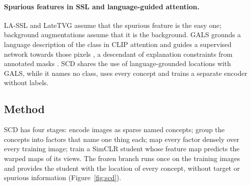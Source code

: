 \documentclass[11pt]{article}
\begin{document}
\paragraph{Spurious features in SSL and language-guided attention.} LA-SSL \citep{zhu2023lassl} and LateTVG
\citep{hamidieh2024latetvg} assume that the spurious feature is the easy one; background augmentations
\citep{ryali2021background} assume that it is the background. GALS grounds a language description of the class in
CLIP attention and guides a supervised network towards those pixels \citep{petryk2022gals}, a descendant of
explanation constraints from annotated masks \citep{ross2017rrr}. SCD shares the use of language-grounded locations
with GALS, while it names no class, uses every concept and trains a separate encoder without labels.

\subsection{Method}
SCD has four stages: encode images as sparse named concepts; group the concepts into factors that name one thing
each; map every factor densely over every training image; train a SimCLR student whose feature map predicts the
warped maps of its views. The frozen branch runs once on the training images and provides the student with the
location of every concept, without target or spurious information (Figure~\ref{fig:scd}).
\end{document}
